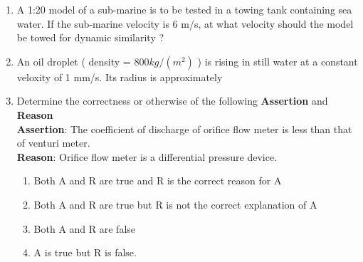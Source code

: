 \documentclass[journal,12pt,onecolumn]{IEEEtran}
\theoremstyle{remark}
\begin{document}
\begin{enumerate}
\begin{enumerate}
		\end{enumerate}
	\item A 1:20 model of a sub-marine is to be tested in a towing tank containing sea water. If the sub-marine velocity is 6 m/s, at what velocity should the model be towed for dynamic similarity ?
		\begin{enumerate}
		\end{enumerate}
	\item An oil droplet ( density = $800 kg/(m^2)$ ) is rising in still water at a constant veloxity of 1 mm/s. Its radius is approximately
		\begin{enumerate}
				\begin{multicols}{4}
				\item $ 21 \mu $
				\item $ 24 \mu $
				\item $ 34 \mu $
				\item $ 47 \mu $
				\end{multicols}
		\end{enumerate}
	\item Determine the correctness or otherwise of the following \textbf{Assertion} and \textbf{Reason} \\
		\textbf{Assertion}: The coefficient of discharge of orifice flow meter is less than that of venturi meter. \\
		\textbf{Reason}: Orifice flow meter is a differential pressure device.
		\begin{enumerate}
			\item Both A and R are true and R is the correct reason for A
			\item Both A and R are true but R is not the correct explanation of A
			\item Both A and R are false
			\item A is true but R is false.
		\end{enumerate}\\

\end{enumerate}
\end{document}
